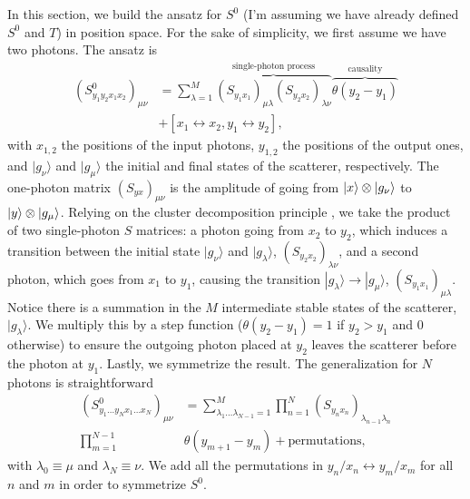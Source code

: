 \documentclass[aps,pra,reprint,amsmath,amssymb]{revtex4-1}
\begin{document}
In this section, we build the ansatz for $S^0$ {\color{blue}(I'm assuming we have already defined $S^0$ and $T$)} in position space. For the sake of simplicity, we first assume we have two photons. The ansatz is
\begin{align}\label{eq:S0_2}
(S^0_{y_1y_2x_1x_2})_{\mu\nu}& = \sum_{\lambda=1}^M \overbrace{(S_{y_1x_1})_{\mu\lambda}(S_{y_2x_2})_{\lambda\nu}}^{\text{single-photon process}}\overbrace{\theta(y_2-y_1)}^\text{causality} \nonumber\\
&+ [x_1\leftrightarrow x_2,y_1\leftrightarrow y_2],
\end{align}
with $x_{1,2}$ the positions of the input photons, $y_{1,2}$ the positions of the output ones, and $|g_\nu\rangle$ and $|g_\mu\rangle$ the initial and final states of the scatterer, respectively. The one-photon matrix $(S_{yx})_{\mu\nu}$ is the amplitude of going from $\ket{x}\otimes \ket{g_\nu}$ to $\ket{y}\otimes \ket{g_\mu}$. Relying on the cluster decomposition principle \cite{weinberg1995}, we take the product of two single-photon $S$ matrices: a photon going from $x_2$ to $y_2$, which induces a transition between  the initial state $|g_\nu\rangle$ and $|g_\lambda\rangle$, $(S_{y_2x_2})_{\lambda\nu}$, and a second photon, which goes from $x_1$ to $y_1$, causing the transition $|g_\lambda\rangle\to |g_\mu\rangle$, $(S_{y_1x_1})_{\mu\lambda}$. Notice there is a summation in the $M$ intermediate stable states of the scatterer, $|g_\lambda\rangle$. We multiply this by a step function ($\theta(y_2-y_1)=1$ if $y_2>y_1$ and $0$ otherwise) to ensure the outgoing photon placed at $y_2$ leaves the scatterer before the photon at $y_1$. Lastly, we symmetrize the result. The generalization for $N$ photons is straightforward
\begin{align}\label{eq:S0_N}
(S^0_{y_1\dots y_N x_1\dots x_N})_{\mu\nu}& = \sum_{\lambda_1\dots \lambda_{N-1}=1}^M\prod_{n=1}^N (S_{y_nx_n})_{\lambda_{n-1}\lambda_n}\nonumber\\
\prod_{m=1}^{N-1}&\theta(y_{m+1}-y_m) + \text{permutations},
\end{align}
with $\lambda_0\equiv \mu$ and $\lambda_N\equiv\nu$. We add all the permutations in $y_n/x_n\leftrightarrow y_m/x_m$ for all $n$ and $m$ in order to symmetrize $S^0$.
\end{document}
